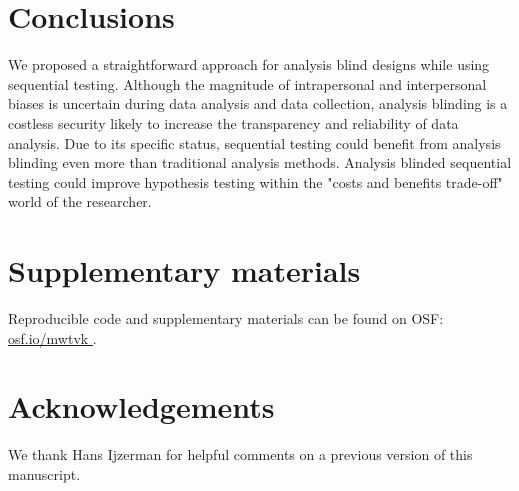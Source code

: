 \documentclass[a4paper,man,natbib,floatsintext,donotrepeattitle]{apa6}
\begin{document}
\section{Conclusions}


We proposed a straightforward approach for analysis blind designs while using sequential testing. Although the magnitude of intrapersonal and interpersonal biases is uncertain during data analysis and data collection, analysis blinding is a costless security likely to increase the transparency and reliability of data analysis. Due to its specific status, sequential testing could benefit from analysis blinding even more than traditional analysis methods. Analysis blinded sequential testing could improve hypothesis testing within the "costs and benefits trade-off" world of the researcher.

\section{Supplementary materials}\label{sec:supp}

Reproducible code and supplementary materials can be found on OSF: \url{osf.io/mwtvk
}.

\section{Acknowledgements}

We thank Hans Ijzerman for helpful comments on a previous version of this manuscript.


\end{document}
